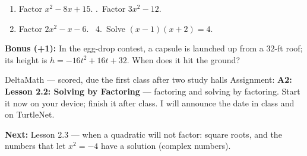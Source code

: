 \documentclass[aspectratio=169, 11pt]{beamer}
\begin{document}
\begin{frame}[t, plain]
  \begin{enumerate}\setlength{\itemsep}{3pt}
    \item Factor $x^2-8x+15$. \qquad\qquad\;.\ Factor $3x^2-12$.
    \setcounter{enumi}{2}
    \item Factor $2x^2-x-6$. \qquad\qquad\;\;\, 4.\ Solve $(x-1)(x+2)=4$.
  \end{enumerate}
  {\small\textbf{Bonus (+1):} In the egg-drop contest, a capsule is launched up from a $32$-ft
  roof; its height is $h=-16t^2+16t+32$. When does it hit the ground?}
  \vspace{2pt}
\end{frame}

\begin{frame}[t, plain]
  \begin{block}{DeltaMath --- scored, due the first class after two study halls}
    Assignment: \textbf{A2: Lesson 2.2: Solving by Factoring} --- factoring and solving by factoring. Start
    it now on your device; finish it after class. I will announce the date in class and on
    TurtleNet.
  \end{block}
  \vspace{6pt}
  \textbf{Next:} Lesson 2.3 --- when a quadratic will not factor: square roots, and the numbers
  that let $x^2=-4$ have a solution (complex numbers).
\end{frame}
\end{document}
